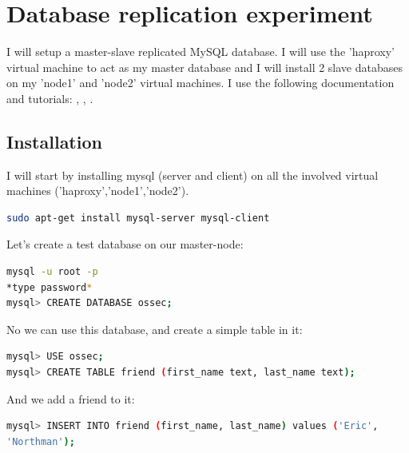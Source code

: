 \documentclass[12pt]{report}
\begin{document}
\section{Database replication experiment}
I will setup a master-slave replicated MySQL database. I will use the
'haproxy' virtual machine to act as my master database and I will
install 2 slave databases on my 'node1' and 'node2' virtual machines.
I use the following documentation and tutorials:
\cite{mysql_official_replication_doc}, \cite{mysql_replication_howtoforge}, \cite{mysql_replication_stackexchange}.

\subsection{Installation} 
I will start by installing mysql (server and client) on all the involved virtual
machines ('haproxy','node1','node2').
\begin{lstlisting}[language=bash]
sudo apt-get install mysql-server mysql-client
\end{lstlisting}

Let's create a test database on our master-node:
\begin{lstlisting}[language=bash]
mysql -u root -p
*type password*
mysql> CREATE DATABASE ossec;
\end{lstlisting}
No we can use this database, and create a simple table in it:
\begin{lstlisting}[language=bash]
mysql> USE ossec;
mysql> CREATE TABLE friend (first_name text, last_name text);
\end{lstlisting}
And we add a friend to it:
\begin{lstlisting}[language=bash]
mysql> INSERT INTO friend (first_name, last_name) values ('Eric',
'Northman');
\end{lstlisting}
\end{document}
